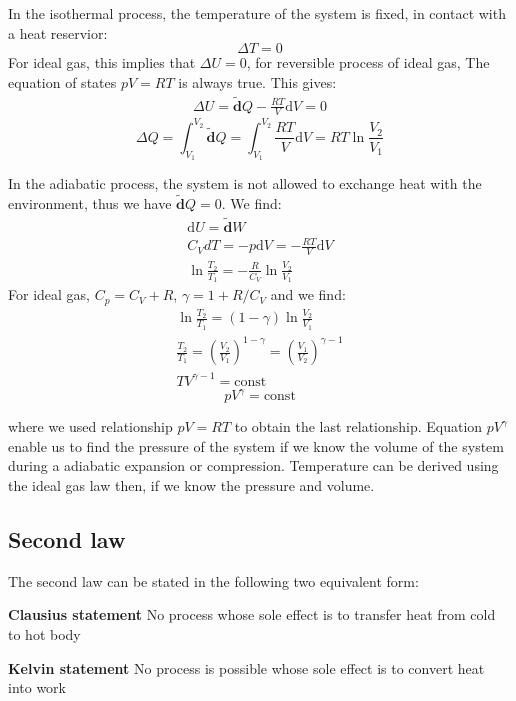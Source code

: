 \documentclass{article}
\newcommand{\dbar}{\mathbf{\tilde{d}}}
\newcommand{\dnor}{\text{d}}
\begin{document}
In the isothermal process, the temperature of the system is fixed, in contact with a heat reservior:
\begin{equation}
    \Delta T = 0
\end{equation}
For ideal gas, this implies that $\Delta U = 0$, for reversible process of ideal gas, The 
equation of states $pV = RT$ is always true. This gives:
\begin{gather}
    \Delta U = \dbar Q - \frac{RT}{V} \dnor V = 0
\end{gather}
\[
\boxed{\Delta Q = \int_{V_1}^{V_2} \dbar Q = \int_{V_1}^{V_2} \frac{RT}{V} \dnor V = RT \ln \frac{V_2}{V_1}}
\]

In the adiabatic process, the system is not allowed to exchange heat with the 
environment, thus we have $\dbar Q = 0$. We find:
\begin{gather}
    \dnor U = \dbar W \\
    C_V dT = - p \dnor V = - \frac{RT}{V} \dnor V \\
    \ln \frac{T_2}{T_1} = - \frac{R}{C_V} \ln \frac{V_2}{V_1}
\end{gather}
For ideal gas, $C_p = C_V + R$, $\gamma = 1 + R / C_V$ and we find:
\begin{gather}
    \ln \frac{T_2}{T_1} = (1-\gamma) \ln \frac{V_2}{V_1} \\
    \frac{T_2}{T_1} = \left( \frac{V_2}{V_1} \right) ^ {1-\gamma} = \left( \frac{V_1}{V_2} \right) ^ {\gamma-1} \\
    T V^{\gamma - 1} = \text{const}
\end{gather}
\[ \boxed{p V^{\gamma} = \text{const}} \]

where we used relationship $pV = RT$ to obtain the last relationship. Equation $p V^{\gamma}$ 
enable us to find the pressure of the system if we know the volume of the 
system during a adiabatic expansion or compression. Temperature can be derived using the ideal 
gas law then, if we know the pressure and volume.

\subsection{Second law}
The second law can be stated in the following two equivalent form:

\textbf{Clausius statement} No process whose sole effect is to transfer heat from cold to hot body

\textbf{Kelvin statement} No process is possible whose sole effect is to convert heat into work
\end{document}
